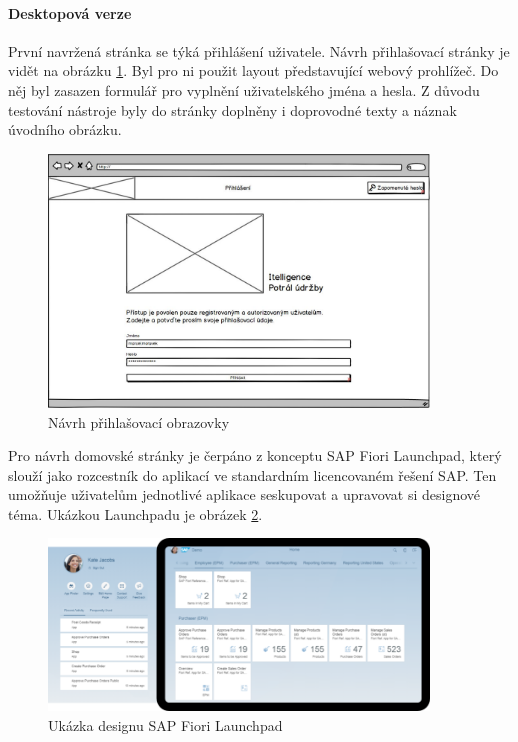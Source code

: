 \documentclass[thesis=M,czech]{FITthesis}[2012/06/26]
\begin{document}
\paragraph{Desktopová verze}
První navržená stránka se týká přihlášení uživatele. Návrh přihlašovací stránky je vidět na obrázku \ref{img:bal_login_desktop}. Byl pro ni použit layout představující webový prohlížeč. Do něj byl zasazen formulář pro vyplnění uživatelského jména a hesla. Z důvodu testování nástroje byly do stránky doplněny i doprovodné texty a náznak úvodního obrázku. 
\begin{figure}[H]
	\centering
	\includegraphics[width=0.9\textwidth]{images/bal_login}
	\caption{Návrh přihlašovací obrazovky}
	\label{img:bal_login_desktop}
\end{figure}
Pro návrh domovské stránky je čerpáno z konceptu SAP Fiori Launchpad, který slouží jako rozcestník do aplikací ve standardním licencovaném řešení SAP. Ten umožňuje uživatelům jednotlivé aplikace seskupovat a upravovat si designové téma. Ukázkou Launchpadu je obrázek \ref{img:fiori_launchpad}. 
\begin{figure}[H]
	\centering
	\includegraphics[width=0.9\textwidth]{images/fiori_launchpad}
	\caption{Ukázka designu SAP Fiori Launchpad \cite{sap_fiori}}
	\label{img:fiori_launchpad}
\end{figure}
\end{document}
